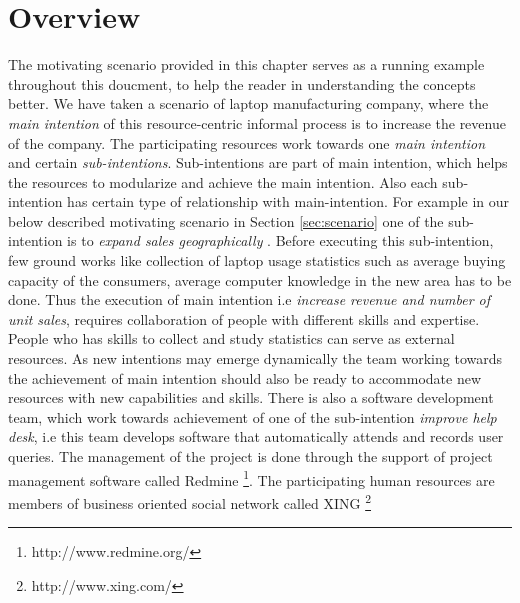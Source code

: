 \section{Overview}
\label{sec:overview}
The motivating scenario provided in this chapter serves as a running example throughout this doucment, to help the reader in understanding the concepts better. We have taken a scenario of laptop manufacturing company, where the \textit{main intention} of this resource-centric informal process is to increase the revenue of the company. The participating resources work towards one \textit{main intention} and certain \textit{sub-intentions}. Sub-intentions are part of main intention, which helps the resources to modularize and achieve the main intention. Also each sub-intention has certain type of relationship with main-intention. For example in our below described motivating scenario in Section \ref{sec:scenario} one of the sub-intention is to \textit{expand sales geographically} . Before executing this sub-intention, few ground works like collection of laptop usage statistics such as average buying capacity of the consumers, average computer knowledge in the new area has to be done. Thus the execution of main intention i.e \textit{increase revenue and number of unit sales}, requires collaboration of people with different skills and expertise. People who has skills to collect and study statistics can serve as external resources. As new intentions may emerge dynamically the team working towards the achievement of main intention should also be ready to accommodate new resources with new capabilities and skills. There is also a software development team, which work towards achievement of one of the sub-intention \textit{improve help desk}, i.e this team develops software that automatically attends and records user queries.  The management of the project is done through the support of project management software called Redmine \footnote{http://www.redmine.org/}. The participating human resources are members of business oriented social network called XING \footnote{http://www.xing.com/}
 





